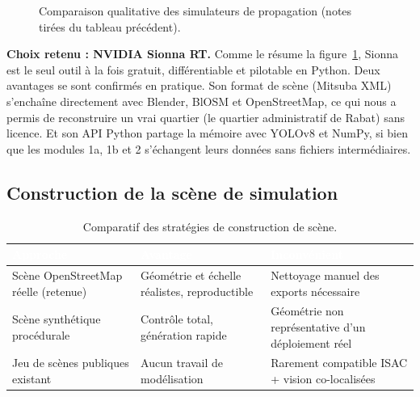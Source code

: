 \documentclass[12pt,a4paper,titlepage]{article}
\newcommand{\hd}[1]{\textcolor{white}{\textbf{#1}}}
\newcommand{\choix}{\rowcolor{tabchoice}}
\begin{document}
\begin{figure}[H]
    \centering
    \caption{Comparaison qualitative des simulateurs de propagation (notes tirées du tableau précédent).}
    \label{fig:chart_simulateur}
\end{figure}

\textbf{Choix retenu : NVIDIA Sionna RT.} Comme le résume la figure~\ref{fig:chart_simulateur}, Sionna est le seul outil à la fois gratuit, différentiable et pilotable en Python. Deux avantages se sont confirmés en pratique. Son format de scène (Mitsuba XML) s'enchaîne directement avec Blender, BlOSM et OpenStreetMap, ce qui nous a permis de reconstruire un vrai quartier (le quartier administratif de Rabat) sans licence. Et son API Python partage la mémoire avec YOLOv8 et NumPy, si bien que les modules 1a, 1b et 2 s'échangent leurs données sans fichiers intermédiaires.

\subsection{Construction de la scène de simulation}

\begin{table}[H]
    \centering
    \caption{Comparatif des stratégies de construction de scène.}
    \begin{tabularx}{\textwidth}{F{4cm}LL}
        \toprule
        \hd{Approche} & \hd{Avantage} & \hd{Inconvénient} \\
        \midrule
        \choix Scène OpenStreetMap réelle (retenue) & Géométrie et échelle réalistes, reproductible & Nettoyage manuel des exports nécessaire \\
        Scène synthétique procédurale & Contrôle total, génération rapide & Géométrie non représentative d'un déploiement réel \\
        Jeu de scènes publiques existant & Aucun travail de modélisation & Rarement compatible ISAC + vision co-localisées \\
        \bottomrule
    \end{tabularx}
\end{table}
\end{document}
